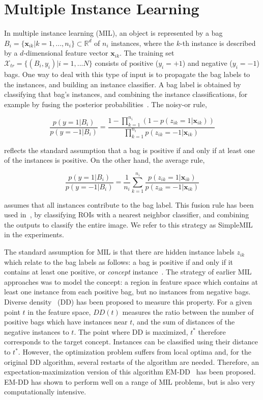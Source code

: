 \documentclass[10pt,conference,a4paper]{IEEEtran}
\begin{document}
\section{Multiple Instance Learning}\label{sec:mil}

In multiple instance learning (MIL), an object is represented by a bag $B_i  = \{\mathbf{x}_{ik}| k=1,...,n_i\} \subset \mathbb{R}^d$ of $n_i$ instances, where the $k$-th instance is described by a $d$-dimensional feature vector $\mathbf{x}_{ik}$. The training set $\mathcal{X}_{tr} = \{(B_i, y_i) | i=1,...N\}$ consists of positive ($y_i = +1$) and negative ($y_i = -1$) bags. One way to deal with this type of input is to propagate the bag labels to the instances, and building an instance classifier.  A bag label is obtained by classifying that bag's instances, and combining the instance classifications, for example by fusing the posterior probabilities~\cite{loog2004static}. The noisy-or rule,

\begin{equation}\label{eq:noisyor}
\frac{p(y=1|B_i)}{p(y=-1|B_i)} = \frac{1 - \prod_{k=1}^{n_i} (1-p(z_{ik}=1|\mathbf{x}_{ik}))}{\prod_{k=1}^{n_i} p(z_{ik}=-1|\mathbf{x}_{ik})}
\end{equation}

reflects the standard assumption that a bag is positive if and only if at least one of the instances is positive. On the other hand, the average rule,

\begin{equation}\label{eq:average}
\frac{p(y=1|B_i)}{p(y=-1|B_i)} = \frac{1}{n_i} \sum_{k=1}^{n_i} \frac{ p(z_{ik}=1|\mathbf{x}_{ik})} {p(z_{ik}=-1|\mathbf{x}_{ik})}
\end{equation}

assumes that all instances contribute to the bag label. This fusion rule has been used in~\cite{sorensen2012texture}, by classifying ROIs with a nearest neighbor classifier, and combining the outputs to classify the entire image. We refer to this strategy as SimpleMIL in the experiments.

The standard assumption for MIL is that there are hidden instance labels $z_{ik}$ which relate to the bag labels as follows: a bag is positive if and only if it contains at least one positive, or \emph{concept} instance~\cite{dietterich1997solving}. The strategy of earlier MIL approaches was to model the concept: a region in feature space which contains at least one instance from each positive bag, but no instances from negative bags. Diverse density~\cite{maron1998framework} (DD) has been proposed to measure this property. For a given point $t$ in the feature space, $DD(t)$ measures the ratio between the number of positive bags which have instances near $t$, and the sum of distances of the negative instances to $t$. The point where DD is maximized, $t^*$ therefore corresponds to the target concept. Instances can be classified using their distance to $t^*$. However, the optimization problem suffers from local optima and, for the original DD algorithm, several restarts of the algorithm are needed. Therefore, an expectation-maximization version of this algorithm EM-DD~\cite{zhang2001dd} has been proposed. EM-DD has shown to perform well on a range of MIL problems, but is also very computationally intensive.
\end{document}
